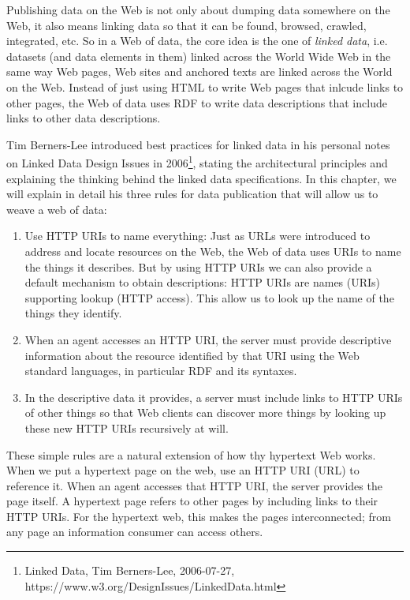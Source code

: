 Publishing data on the Web is not only about dumping data somewhere on
the Web, it also means linking data so that it can be found, browsed,
crawled, integrated, etc. So in a Web of data, the core idea is the one
of \emph{linked data}, i.e. datasets (and data elements in them)  linked across the
World Wide Web in the same way Web pages, Web sites and anchored texts
are linked across the World on the Web. Instead of just
using HTML to write Web pages that inlcude links to other pages, the Web of
data uses RDF to write data descriptions that include links to other data
descriptions.

Tim Berners-Lee introduced best practices for linked data in his
personal notes on Linked Data Design Issues in 2006\footnote{Linked
  Data, Tim Berners-Lee, 2006-07-27,
  https://www.w3.org/DesignIssues/LinkedData.html}, stating the
architectural principles and explaining the thinking behind the linked data
specifications.   In this chapter, we will explain in detail his three rules 
for data publication that will allow us to weave a web of data:



\begin{enumerate}
\def\labelenumi{\arabic{enumi}.}
\item
\label{ruleURI}
  Use HTTP URIs to name everything: Just as URLs were introduced to
  address and locate resources on the Web, the Web of data uses URIs to
  name the things it describes. But by using HTTP URIs we can also
  provide a default mechanism to obtain descriptions: HTTP URIs are
  names (URIs) supporting lookup (HTTP access). This allow us to
  look up the name of the things they identify.
\item
\label{ruleFYN}
  When an agent accesses an HTTP URI, the server must provide descriptive
  information about the resource identified by that URI using the Web
  standard languages, in particular RDF and its syntaxes.
\item
\label{ruleLink}
  In the descriptive data it provides, a server must include links to
  HTTP URIs of other things so that Web clients can discover more things
  by looking up these new HTTP URIs recursively at will.
\end{enumerate}

These simple rules are a natural extension of how thy hypertext Web works. When we put a hypertext page 
on the web, use an HTTP URI (URL) to reference it.  When an agent accesses that HTTP URI, the server provides 
the page itself.  A hypertext page refers to other pages by including links to their HTTP URIs. 
For the hypertext web, this makes the pages interconnected; from any page an 
information consumer can access others.

